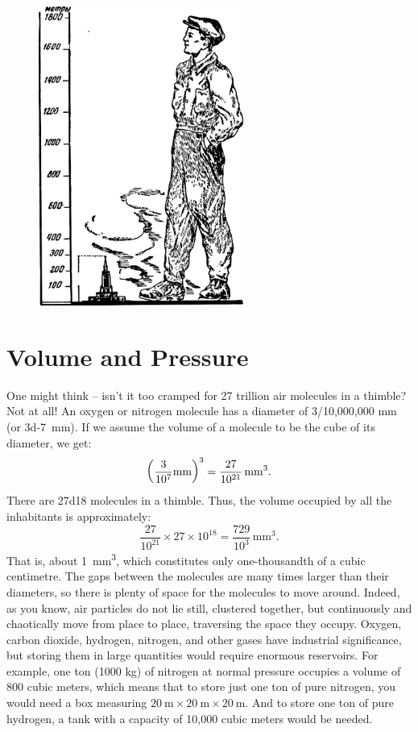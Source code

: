 \begin{figure}[h!]
\centering
\includegraphics[width=0.6\textwidth]{figures/ch-11/fig-161.pdf}
\end{figure}


\section{Volume and Pressure}
\label{sec-11.2}

One might think -- isn’t it too cramped for 27 trillion air molecules in a thimble? Not at all! An oxygen or nitrogen molecule has a diameter of 3/10,000,000 mm (or \SI{3d-7}{\milli\meter}). If we assume the volume of a molecule to be the cube of its diameter, we get:
\begin{equation*}%
\left( \frac{3}{10^{7}} \si{\milli\meter} \right)^3 = \frac{27}{\num{d21}} \,\si{\milli\meter\cubed}.
\end{equation*}
There are \num{27d18} molecules in a thimble. Thus, the volume occupied by all the inhabitants is approximately:
\begin{equation*}%
\frac{27}{10^{21}} \times 27 \times 10^{18} = \frac{729}{10^3} \,\si{\milli\meter\cubed}.
\end{equation*}
That is, about \SI{1}{\milli\meter\cubed}, which constitutes only one-thousandth of a cubic centimetre. The gaps between the molecules are many times larger than their diameters, so there is plenty of space for the molecules to move around. Indeed, as you know, air particles do not lie still, clustered together, but continuously and chaotically move from place to place, traversing the space they occupy. Oxygen, carbon dioxide, hydrogen, nitrogen, and other gases have industrial significance, but storing them in large quantities would require enormous reservoirs. For example, one ton (1000 kg) of nitrogen at normal pressure occupies a volume of 800 cubic meters, which means that to store just one ton of pure nitrogen, you would need a box measuring $\SI{20}{\meter} \times \SI{20}{\meter} \times \SI{20}{\meter}$. And to store one ton of pure hydrogen, a tank with a capacity of 10,000 cubic meters would be needed.


